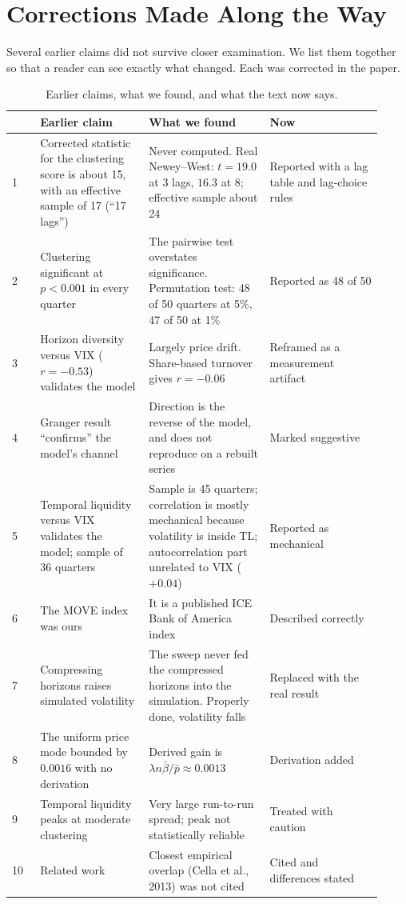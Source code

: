 \section{Corrections Made Along the Way}
\label{sec:corrections}

Several earlier claims did not survive closer examination. We list them together so that a reader can see exactly what changed. Each was corrected in the paper.

\begin{table}[htbp]
\centering
\caption{Earlier claims, what we found, and what the text now says.}
\label{tab:corr}
\small
\begin{tabular}{p{0.07\linewidth}p{0.27\linewidth}p{0.30\linewidth}p{0.28\linewidth}}
\toprule
 & \textbf{Earlier claim} & \textbf{What we found} & \textbf{Now}\\
\midrule
1 & Corrected statistic for the clustering score is about 15, with an effective sample of 17 (``17 lags'') & Never computed. Real Newey--West: $t=19.0$ at 3 lags, $16.3$ at 8; effective sample about 24 & Reported with a lag table and lag-choice rules\\
2 & Clustering significant at $p<0.001$ in every quarter & The pairwise test overstates significance. Permutation test: 48 of 50 quarters at 5\%, 47 of 50 at 1\% & Reported as 48 of 50\\
3 & Horizon diversity versus VIX ($r=-0.53$) validates the model & Largely price drift. Share-based turnover gives $r=-0.06$ & Reframed as a measurement artifact\\
4 & Granger result ``confirms'' the model's channel & Direction is the reverse of the model, and does not reproduce on a rebuilt series & Marked suggestive\\
5 & Temporal liquidity versus VIX validates the model; sample of 36 quarters & Sample is 45 quarters; correlation is mostly mechanical because volatility is inside TL; autocorrelation part unrelated to VIX ($+0.04$) & Reported as mechanical\\
6 & The MOVE index was ours & It is a published ICE Bank of America index & Described correctly\\
7 & Compressing horizons raises simulated volatility & The sweep never fed the compressed horizons into the simulation. Properly done, volatility falls & Replaced with the real result\\
8 & The uniform price mode bounded by $0.0016$ with no derivation & Derived gain is $\lambda n\bar\beta/\bar p\approx 0.0013$ & Derivation added\\
9 & Temporal liquidity peaks at moderate clustering & Very large run-to-run spread; peak not statistically reliable & Treated with caution\\
10 & Related work & Closest empirical overlap (Cella et al., 2013) was not cited & Cited and differences stated\\
\bottomrule
\end{tabular}
\end{table}

